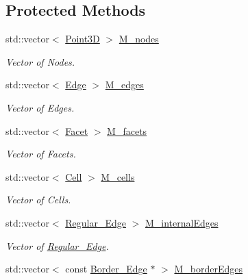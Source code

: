 \subsection*{Protected Methods}
\begin{DoxyCompactItemize}
\item 
std\+::vector$<$ \hyperlink{classFVCode3D_1_1Point3D}{Point3D} $>$ \hyperlink{classFVCode3D_1_1Rigid__Mesh_a400c29e5aa35a8dbdbcdca33c104a4b9}{M\+\_\+nodes}
\begin{DoxyCompactList}\small\item\em Vector of Nodes. \end{DoxyCompactList}\item 
std\+::vector$<$ \hyperlink{classFVCode3D_1_1Rigid__Mesh_1_1Edge}{Edge} $>$ \hyperlink{classFVCode3D_1_1Rigid__Mesh_a4c6287c9256a92c13486048c372fe487}{M\+\_\+edges}
\begin{DoxyCompactList}\small\item\em Vector of Edges. \end{DoxyCompactList}\item 
std\+::vector$<$ \hyperlink{classFVCode3D_1_1Rigid__Mesh_1_1Facet}{Facet} $>$ \hyperlink{classFVCode3D_1_1Rigid__Mesh_a62757eb1d9c54b4421880b3c271b4c3b}{M\+\_\+facets}
\begin{DoxyCompactList}\small\item\em Vector of Facets. \end{DoxyCompactList}\item 
std\+::vector$<$ \hyperlink{classFVCode3D_1_1Rigid__Mesh_1_1Cell}{Cell} $>$ \hyperlink{classFVCode3D_1_1Rigid__Mesh_ad19dc70b4efddafb6e8d8d4980bd23d6}{M\+\_\+cells}
\begin{DoxyCompactList}\small\item\em Vector of Cells. \end{DoxyCompactList}\item 
std\+::vector$<$ \hyperlink{classFVCode3D_1_1Rigid__Mesh_1_1Regular__Edge}{Regular\+\_\+\+Edge} $>$ \hyperlink{classFVCode3D_1_1Rigid__Mesh_a3b689233b2590d76d663195b89d380fb}{M\+\_\+internal\+Edges}
\begin{DoxyCompactList}\small\item\em Vector of \hyperlink{classFVCode3D_1_1Rigid__Mesh_1_1Regular__Edge}{Regular\+\_\+\+Edge}. \end{DoxyCompactList}\item 
std\+::vector$<$ const \hyperlink{classFVCode3D_1_1Rigid__Mesh_1_1Border__Edge}{Border\+\_\+\+Edge} $\ast$ $>$ \hyperlink{classFVCode3D_1_1Rigid__Mesh_af9ba7882baec8f8e5e7693a38f3cbc9b}{M\+\_\+border\+Edges}

\end{DoxyCompactItemize}

